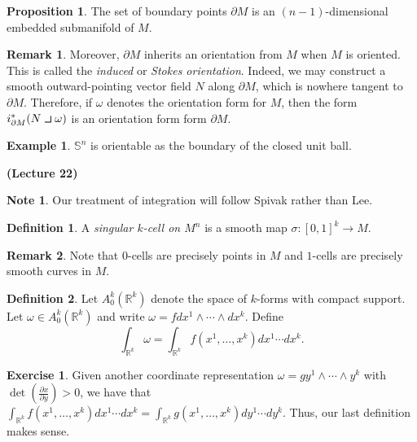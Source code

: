 \documentclass[10pt,letterpaper,cm]{nupset}
\theoremstyle{definition}
\newtheorem*{definition}{Definition}
\newtheorem{exmp}{Example}
\newtheorem{remark}{Remark}
\newtheorem*{note}{Note}
\newtheorem{exercise}{Exercise}
\newtheorem{prop}{Proposition}
\newcommand{\R}{\mathbb R}
\renewcommand{\S}{\mathbb S}
\newcommand{\1}{\mathbf{1}}
\newcommand{\0}{\vec 0}
\newcommand{\intprodl}{%
    \mathbin{\scalebox{1.5}{$\lrcorner$}}%
}
\begin{document}
\begin{prop}
The set of boundary points $\partial{M}$ is an $(n-1)$-dimensional embedded submanifold of $M$.
\end{prop}

\begin{remark}
Moreover, $\partial{M}$ inherits an orientation from $M$ when $M$ is oriented. This is called the \textit{induced} or \textit{Stokes orientation}. Indeed, we may construct a smooth  outward-pointing vector field $N$ along $\partial{M}$, which is nowhere tangent to $\partial{M}$. Therefore,  if $\omega$ denotes the orientation form for $M$, then the form $i^{\ast}_{\partial{M}}(N \intprodl \omega)$ is an orientation form form $\partial{M}$.
\end{remark}
\begin{exmp}
$\S^n$ is orientable as the boundary of the closed unit ball.
\end{exmp}

\begin{center}
{\textbf{(Lecture 22)}} 
\end{center}

\begin{note}
Our treatment of integration will  follow Spivak rather than Lee.
\end{note}

\begin{definition}
A \textit{singular $k$-cell on $M^n$} is a smooth map $\sigma : [0,1]^k \to M$.
\end{definition}

\begin{remark}
Note that $0$-cells are precisely points in $M$ and $1$-cells are precisely smooth curves in $M$.
\end{remark}

\begin{definition}
Let $A_0^k(\R^k)$ denote the space of $k$-forms with compact support. Let $\omega \in A_0^k(\R^k)$ and write $\omega = fdx^1\wedge \cdots \wedge dx^k$. Define $$ \int_{\R^k}\omega = \int_{\R^k} f(x^1, \ldots, x^k)dx^1\cdots dx^k  .$$
\end{definition}

\begin{exercise}
Given another coordinate representation $\omega = gy^1 \wedge \cdots \wedge y^k$ with $\det(\frac{\partial{x}}{\partial{y}}) >0$, we have that $\int_{\R^k} f(x^1, \ldots, x^k)dx^1\cdots dx^k  = \int_{\R^k} g(x^1, \ldots, x^k)dy^1\cdots dy^k.$ Thus, our last definition makes sense.
\end{exercise}
\end{document}
